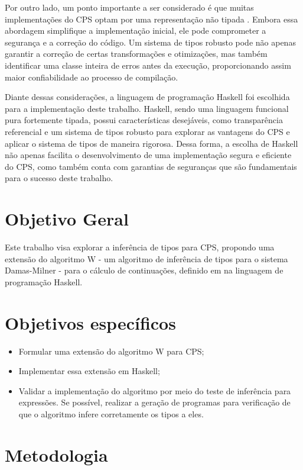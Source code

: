 Por outro lado, um ponto importante a ser considerado é que muitas implementações do CPS optam por uma representação não tipada \cite{MORRISSET1999}. Embora essa abordagem simplifique a implementação inicial, ele pode comprometer a segurança e a correção do código.
Um sistema de tipos robusto pode não apenas garantir a correção de certas transformações e otimizações, mas também identificar uma classe inteira de erros antes da execução, proporcionando assim maior confiabilidade ao processo de compilação.

Diante dessas considerações, a linguagem de programação Haskell foi escolhida para a implementação deste trabalho.
Haskell, sendo uma linguagem funcional pura fortemente tipada, possui características desejáveis, como transparência referencial \cite{SONDERGAARD1990} e um sistema de tipos robusto para explorar as vantagens do CPS e aplicar o sistema de tipos de maneira rigorosa.
Dessa forma, a escolha de Haskell não apenas facilita o desenvolvimento de uma implementação segura e eficiente do CPS, como também conta com garantias de seguranças que são fundamentais para o sucesso deste trabalho.

\section{Objetivo Geral}\label{sec:objetivo-geral}

Este trabalho visa explorar a inferência de tipos para CPS, propondo uma extensão do algoritmo W - um algoritmo de inferência de tipos para o sistema Damas-Milner - para o cálculo de continuações, definido em \cite{TORRENS2024} na linguagem de programação Haskell.

\section{Objetivos específicos}\label{sec:objetivos-especificos}

\begin{itemize}
  \item Formular uma extensão do algoritmo W para CPS;
  \item Implementar essa extensão em Haskell;
  \item Validar a implementação do algoritmo por meio do teste de inferência para expressões. Se possível, realizar a geração de programas para verificação de que o algoritmo infere corretamente os tipos a eles.
\end{itemize}

\section{Metodologia}\label{sec:metodologia}

